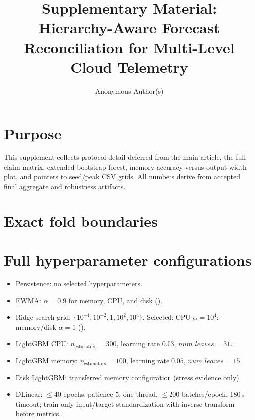 \documentclass[a4paper,fleqn]{cas-dc}
\title[mode=title]{Supplementary Material: Hierarchy-Aware Forecast Reconciliation for Multi-Level Cloud Telemetry}
\author[1]{Anonymous Author(s)}
\affiliation[1]{organization={Anonymous institution}}
\begin{document}
\let\WriteBookmarks\relax
\maketitle
\onecolumn

\renewcommand{\thesection}{S\arabic{section}}
\renewcommand{\thefigure}{S\arabic{figure}}
\renewcommand{\thetable}{S\arabic{table}}
\setcounter{section}{0}
\setcounter{figure}{0}
\setcounter{table}{0}

\section{Purpose}
This supplement collects protocol detail deferred from the main article,
the full claim matrix, extended bootstrap forest, memory
accuracy-versus-output-width plot, and pointers to seed/peak CSV grids.
All numbers derive from accepted final aggregate and robustness artifacts.

\section{Exact fold boundaries}


\section{Full hyperparameter configurations}
\begin{itemize}
  \item Persistence: no selected hyperparameters.
  \item {EWMA}: $\alpha=0.9$ for memory, {CPU}, and disk
    ().
  \item Ridge search grid: $\{10^{-4},10^{-2},1,10^{2},10^{4}\}$.
    Selected: {CPU} $\alpha=10^{4}$; memory/disk $\alpha=1$
    ().
  \item LightGBM {CPU}: $n_{\mathrm{estimators}}=300$, learning rate $0.03$,
    $num\_leaves=31$.
  \item LightGBM memory: $n_{\mathrm{estimators}}=100$, learning rate $0.05$,
    $num\_leaves=15$.
  \item Disk LightGBM: transferred memory configuration (stress evidence only).
  \item DLinear: $\le 40$ epochs, patience $5$, one thread,
    $\le 200$ batches/epoch, 180\,s timeout; train-only input/target
    standardization with inverse transform before metrics.
\end{itemize}
\end{document}

